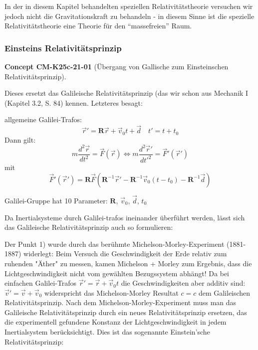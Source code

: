 \documentclass[10pt, letterpaper]{article}
\newcommand{\CustomHeading}[3]{%
  \par\medskip\noindent%
  \textbf{#1 #2} \textnormal{(#3)}.\enskip%
}
\newenvironment{CONC}[2]{\begin{unitbox}\CustomHeading{Concept}{#1}{#2}}{\end{unitbox}}
\begin{document}
In der in diesem Kapitel behandelten speziellen Relativitätstheorie versuchen wir jedoch nicht die Gravitationskraft zu behandeln - in diesem Sinne ist die spezielle Relativitätstheorie eine Theorie für den ``massefreien'' Raum.






\subsubsection*{Einsteins Relativitätsprinzip}

\begin{CONC}{CM-K25c-21-01}{Übergang von Gallische zum Einsteinschen Relativitätsprinzip}
Dieses ersetzt das Galileische Relativitätsprinzip (das wir schon aus Mechanik I (Kapitel 3.2, S. 84) kennen. Letzteres besagt:


allgemeine Galilei-Trafos: 
$$\vec{r}' = \mathbf{R}\vec{r} + \vec{v}_0t + \vec{d} \quad t' = t + t_0$$
Dann gilt:
\[m\frac{d^2\vec{r}}{dt^2} = \vec{F}(\vec{r}) \Leftrightarrow m\frac{d^2\vec{r}'}{dt'^2} = \vec{F}'(\vec{r}')\]
mit 
$$\vec{F}'(\vec{r}') = \mathbf{R}\vec{F}(\mathbf{R}^{-1}\vec{r}' - \mathbf{R}^{-1}\vec{v}_0(t-t_0) - \mathbf{R}^{-1}\vec{d})$$

Galilei-Gruppe hat 10 Parameter: $\mathbf{R}$, $\vec{v}_0$, $\vec{d}$, $t_0$

Da Inertialsysteme durch Galilei-trafos ineinander überführt werden, lässt sich das Galileische Relativitätsprinzip auch so formulieren:


Der Punkt 1) wurde durch das berühmte Michelson-Morley-Experiment (1881-1887) widerlegt: Beim Versuch die Geschwindigkeit der Erde relativ zum ruhenden "Äther" zu messen, kamen Michelson + Morley zum Ergebnis, dass die Lichtgeschwindigkeit nicht vom gewählten Bezugssystem abhängt! Da bei einfachen Galilei-Trafos $\vec{r}' = \vec{r} + \vec{v}_0t$ die Geschwindigkeiten aber additiv sind: $\vec{v}' = \vec{v} + \vec{v}_0$ widerspricht das Michelson-Morley Resultat $c = c$ dem Galileischen Relativitätsprinzip.
Nach dem Michelson-Morley-Experiment muss man das Galileische Relativitätsprinzip durch ein neues Relativitätsprinzip ersetzen, das die experimentell gefundene Konstanz der Lichtgeschwindigkeit in jedem Inertialsystem berücksichtigt. Dies ist das sogenannte Einstein'sche Relativitätsprinzip:


\end{CONC}
\end{document}

